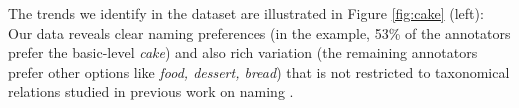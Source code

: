 The trends we identify in the dataset are illustrated in Figure \ref{fig:cake} (left): Our data reveals clear naming preferences (in the example, 53\% of the annotators prefer the basic-level \textit{cake}) and also rich variation (the remaining annotators prefer other options like \textit{food, dessert, bread}) that is not restricted to taxonomical relations studied in previous work on naming \cite{Ordonez:2016,graf2016animal}.

